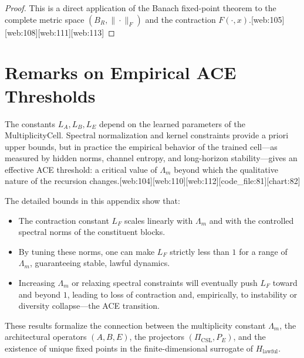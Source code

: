 \documentclass[11pt]{article}
\theoremstyle{definition}
\theoremstyle{plain}
\begin{document}
\begin{proof}
This is a direct application of the Banach fixed-point theorem to the complete metric space $(B_R,\|\cdot\|_F)$ and the contraction $F(\cdot,x)$.[web:105][web:108][web:111][web:113]
\end{proof}

\section{Remarks on Empirical ACE Thresholds}

The constants $L_A,L_B,L_E$ depend on the learned parameters of the MultiplicityCell.
Spectral normalization and kernel constraints provide a priori upper bounds, but in practice the empirical behavior of the trained cell---as measured by hidden norms, channel entropy, and long-horizon stability---gives an effective ACE threshold: a critical value of $\Lambda_m$ beyond which the qualitative nature of the recursion changes.[web:104][web:110][web:112][code_file:81][chart:82]

The detailed bounds in this appendix show that:
\begin{itemize}[leftmargin=*]
  \item The contraction constant $L_F$ scales linearly with $\Lambda_m$ and with the controlled spectral norms of the constituent blocks.
  \item By tuning these norms, one can make $L_F$ strictly less than $1$ for a range of $\Lambda_m$, guaranteeing stable, lawful dynamics.
  \item Increasing $\Lambda_m$ or relaxing spectral constraints will eventually push $L_F$ toward and beyond $1$, leading to loss of contraction and, empirically, to instability or diversity collapse---the ACE transition.
\end{itemize}

These results formalize the connection between the multiplicity constant $\Lambda_m$, the architectural operators $(A,B,E)$, the projectors $(\Pi_{\mathrm{CSL}},P_E)$, and the existence of unique fixed points in the finite-dimensional surrogate of $H_{\mathrm{lawful}}$.



\nocite{*}


\end{document}
